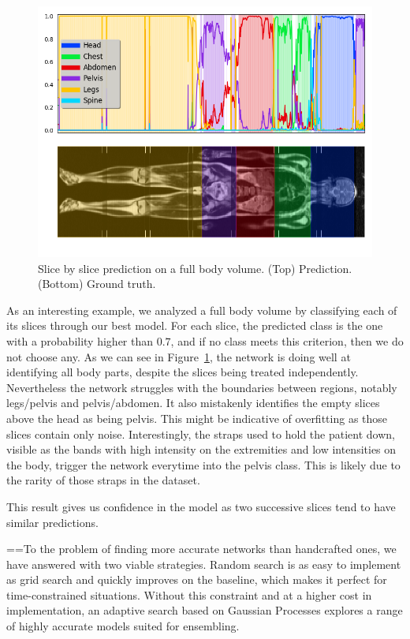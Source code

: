 \begin{figure}[htb]
	\centering
	\includegraphics[width=.95\linewidth]{img_hyperopt/full_body}
	\caption{Slice by slice prediction on a full body volume. (Top) Prediction. (Bottom) Ground truth.}
	\label{fig:full_body}
\end{figure}

As an interesting example, we analyzed a full body volume by classifying each of its slices through our best model. For each slice, the predicted class is the one with a probability higher than $0.7$, and if no class meets this criterion, then we do not choose any. As we can see in Figure~\ref{fig:full_body}, the network is doing well at identifying all body parts, despite the slices being treated independently. Nevertheless the network struggles with the boundaries between regions, notably legs/pelvis and pelvis/abdomen. It also mistakenly identifies the empty slices above the head as being pelvis. This might be indicative of overfitting as those slices contain only noise. Interestingly, the straps used to hold the patient down, visible as the bands with high intensity on the extremities and low intensities on the body, trigger the network everytime into the pelvis class. This is likely due to the rarity of those straps in the dataset.

This result gives us confidence in the model as two successive slices tend to have similar predictions.

==To the problem of finding more accurate networks than handcrafted ones, we have answered with two viable strategies. Random search is as easy to implement as grid search and quickly improves on the baseline, which makes it perfect for time-constrained situations. Without this constraint and at a higher cost in implementation, an adaptive search based on Gaussian Processes explores a range of highly accurate models suited for ensembling.%

